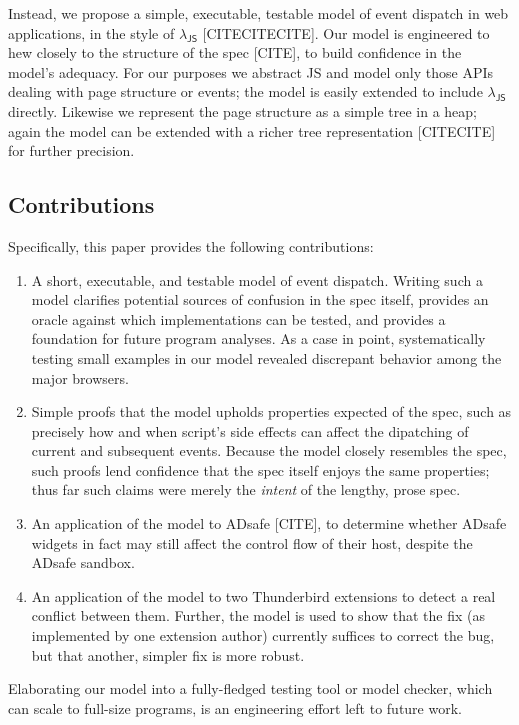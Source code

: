 \documentclass[letterpaper,10pt,twocolumn]{article}
\DeclareRobustCommand{\spec}[1]{\textsf{#1}\xspace}
\DeclareRobustCommand\JS{\spec{JS}}
\DeclareRobustCommand{\LJS}{\ensuremath{\lambda_\JS}\xspace}
\begin{document}
Instead, we propose a simple, executable, testable model of event
dispatch in web applications, in the style of \LJS
[CITECITECITE].  Our model is engineered to hew closely to the
structure of the spec [CITE], to build confidence in the model's
adequacy.  For our purposes we abstract \JS and model only those APIs
dealing with page structure or events; the model is easily extended to
include \LJS directly.  Likewise we represent the page
structure as a simple tree in a heap; again the model can be extended
with a richer tree representation [CITECITE] for further precision.


\subsection{Contributions}
Specifically, this paper provides the following contributions:
\begin{enumerate}
\item A short, executable, and testable model of event dispatch.
  Writing such a model clarifies potential sources of confusion in the
  spec itself, provides an oracle against which implementations can be
  tested, and provides a foundation for future program analyses.  As a
  case in point, systematically testing small examples in our model
  revealed discrepant behavior among the major browsers.
\item Simple proofs that the model upholds properties expected of the
  spec, such as precisely how and when script's side effects can
  affect the dipatching of current and subsequent events.  Because the
  model closely resembles the spec, such proofs lend confidence that
  the spec itself enjoys the same properties; thus far such claims
  were merely the \emph{intent} of the lengthy, prose spec.
\item An application of the model to ADsafe [CITE], to determine
  whether ADsafe widgets in fact may still affect the control flow of
  their host, despite the ADsafe sandbox.
\item An application of the model to two Thunderbird extensions to
  detect a real conflict between them.  Further, the model is used to
  show that the fix (as implemented by one extension author)
  currently suffices to correct the bug, but that another, simpler fix
  is more robust.
\end{enumerate}
Elaborating our model into a fully-fledged testing tool or model
checker, which can scale to full-size programs, is an engineering
effort left to future work.
\end{document}
